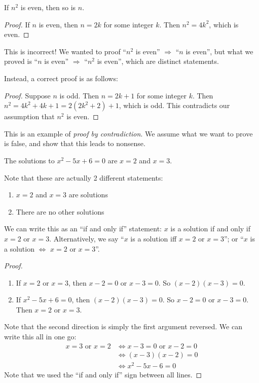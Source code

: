 \documentclass[a4paper]{article}
\begin{document}
\begin{prop}
  If $n^2$ is even, then so is $n$.
\end{prop}

\begin{proof}
  If $n$ is even, then $n = 2k$ for some integer $k$. Then $n^2 = 4k^2$, which is even.
\end{proof}
This is incorrect! We wanted to proof ``$n^2$ is even'' $\Rightarrow $ ``$n$ is even'', but what we proved is ``$n$ is even'' $\Rightarrow$ ``$n^2$ is even'', which are distinct statements.

Instead, a correct proof is as follows:

\begin{proof}
  Suppose $n$ is odd. Then $n = 2k + 1$ for some integer $k$. Then $n^2 = 4k^2 + 4k + 1 = 2(2k^2 + 2) + 1$, which is odd. This contradicts our assumption that $n^2$ is even.
\end{proof}
This is an example of \emph{proof by contradiction}. We assume what we want to prove is false, and show that this leads to nonsense.

\begin{prop}
  The solutions to $x^2 - 5x + 6 = 0$ are $x = 2$ and $x = 3$.
\end{prop}

Note that these are actually 2 different statements:
\begin{enumerate}
  \item $x = 2$ and $x = 3$ are solutions
  \item There are no other solutions
\end{enumerate}
We can write this as an ``if and only if'' statement: $x$ is a solution if and only if $x = 2$ or $x = 3$. Alternatively, we say ``$x$ is a solution iff $x = 2$ or $x = 3$''; or ``$x$ is a solution $\Leftrightarrow$ $x = 2$ or $x = 3$''.

\begin{proof}\leavevmode
  \begin{enumerate}
    \item If $x = 2$ or $x = 3$, then $x - 2 = 0$ or $x - 3 = 0$. So $(x - 2)(x - 3) = 0$.
    \item If $x^2 - 5x + 6 = 0$, then $(x - 2)(x - 3) = 0$. So $x - 2 = 0$ or $x - 3 = 0$. Then $x = 2$ or $x = 3$.
  \end{enumerate}
  Note that the second direction is simply the first argument reversed. We can write this all in one go:
  \begin{align*}
    x = 3 \text{ or }x = 2&\Leftrightarrow x - 3 = 0\text{ or }x - 2 = 0\\
    &\Leftrightarrow (x - 3)(x - 2) = 0\\
    &\Leftrightarrow x^2 - 5x - 6 = 0
  \end{align*}
  Note that we used the ``if and only if'' sign between all lines.
\end{proof}
\end{document}
